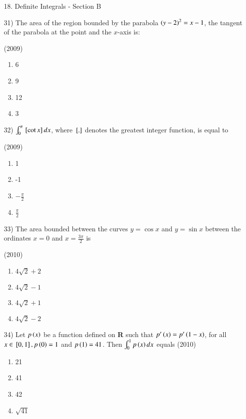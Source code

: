 \documentclass[journal,12pt,twocolumn]{IEEEtran}
\theoremstyle{remark}
\begin{document}
18. Definite Integrals - Section B

31)
	 The area of the region bounded by the parabola $\left(y-2\right)^2=x-1$, the tangent of the parabola at the point  and the $x$-axis is:

		\hfill{(2009)}

		\begin{multicols}{4}
			\begin{enumerate}
				\item 6
				\item 9
				\item 12
				\item 3
			\end{enumerate}
		\end{multicols}

32)
	 $\int_0^\pi{}\left[\cot x\right]dx$, where ${}\left[.\right]$ denotes the greatest integer function, is equal to

		\hfill{(2009)}

		\begin{multicols}{4}
			\begin{enumerate}
				\item 1
				\item -1
				\item $-\frac{\pi}{2}$
				\item $\frac{\pi}{2}$
			\end{enumerate}
		\end{multicols}

33)
	 The area bounded between the curves $y=\cos x$ and $y=\sin x$ between the ordinates $x=0$ and $x=\frac{3\pi}{2}$ is

		\hfill{(2010)}

		\begin{multicols}{2}
			\begin{enumerate}
				\item $4\sqrt{2}+2$
				\item $4\sqrt{2}-1$
				\item $4\sqrt{2}+1$
				\item $4\sqrt{2}-2$
			\end{enumerate}
		\end{multicols}

34)
	 Let $p\left(x\right)$ be a function defined on \textbf{R} such that $p'\left(x\right)=p'\left(1-x\right)$, for all $x\in{}\left[0,1\right],p\left(0\right)=1$ and $p\left(1\right)=41$. Then $\int_0^1p\left(x\right)dx$ equals
		\hfill{(2010)}

		\begin{multicols}{4}
			\begin{enumerate}
				\item 21
				\item 41
				\item 42
				\item $\sqrt{41}$
			\end{enumerate}
		\end{multicols}
\end{document}
